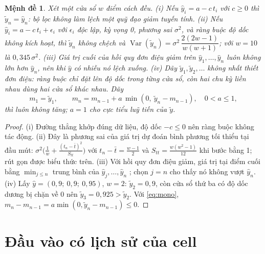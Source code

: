 \documentclass[12pt,a4paper,oneside]{report}
\theoremstyle{plain}
\newtheorem{menhde}{Mệnh đề}[chapter]
\theoremstyle{definition}
\begin{document}
\begin{menhde}\label{prop:filter}
Xét một cửa sổ $w$ điểm cách đều.
(i) Nếu $\hat y_i = a - c\,t_i$ với $c \ge 0$ thì $\tilde y_n = \hat y_n$: bộ lọc không làm lệch một quỹ đạo giảm
tuyến tính.
(ii) Nếu $\hat y_i = a - c\,t_i + \epsilon_i$ với $\epsilon_i$ độc lập, kỳ vọng 0, phương sai $\sigma^2$, và ràng
buộc độ dốc không kích hoạt, thì $\tilde y_n$ không chệch và
$\operatorname{Var}(\tilde y_n) = \sigma^2\,\dfrac{2(2w-1)}{w(w+1)}$; với $w = 10$ là $0{,}345\,\sigma^2$.
(iii) Giá trị cuối của hồi quy đơn điệu giảm trên $\hat y_1, \dots, \hat y_n$ luôn không lớn hơn $\hat y_n$, nên
khi $\hat y$ có nhiễu nó lệch xuống.
(iv) Dãy $\tilde y_1, \tilde y_2, \dots$ không nhất thiết đơn điệu: ràng buộc chỉ đặt lên độ dốc trong từng cửa sổ, còn
hai chu kỳ liền nhau dùng hai cửa sổ khác nhau. Dãy
\begin{equation}\label{eq:mono}
m_1 = \tilde y_1, \qquad m_n = m_{n-1} + a\,\min(0,\ \tilde y_n - m_{n-1}), \quad 0 < a \le 1,
\end{equation}
thì luôn không tăng; $a = 1$ cho cực tiểu luỹ tiến của $\tilde y$.
\end{menhde}
\begin{proof}
(i) Đường thẳng khớp đúng dữ liệu, độ dốc $-c \le 0$ nên ràng buộc không tác động. (ii) Đây là phương sai của giá
trị dự đoán bình phương tối thiểu tại đầu mút: $\sigma^2\big(\frac{1}{w} + \frac{(t_n - \bar t)^2}{S_{tt}}\big)$
với $t_n - \bar t = \frac{w-1}{2}$ và $S_{tt} = \frac{w(w^2-1)}{12}$ khi bước bằng 1; rút gọn được biểu thức trên.
(iii) Với hồi quy đơn điệu giảm, giá trị tại điểm cuối bằng $\min_{j \le n}$ trung bình của $\hat y_j, \dots, \hat y_n$
\cite{barlow1972}; chọn $j = n$ cho thấy nó không vượt $\hat y_n$. (iv) Lấy $\hat y = (0{,}9;\ 0{,}9;\ 0{,}95)$, $w = 2$:
$\tilde y_2 = 0{,}9$, còn cửa sổ thứ ba có độ dốc dương bị chặn về 0 nên $\tilde y_3 = 0{,}925 > \tilde y_2$. Với
\eqref{eq:mono}, $m_n - m_{n-1} = a\min(0, \tilde y_n - m_{n-1}) \le 0$.
\end{proof}

\section{Đầu vào có lịch sử của cell}\label{sec:hist_m}
\end{document}
